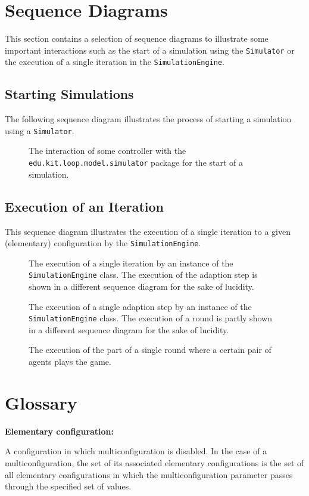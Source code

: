 \documentclass[parskip=full,11pt]{scrartcl}
\begin{document}
\section{Sequence Diagrams}
This section contains a selection of sequence diagrams to illustrate some important interactions such as the start of a simulation using the \texttt{Simulator} or the execution of a single iteration in the \texttt{SimulationEngine}.

\subsection{Starting Simulations}
The following sequence diagram illustrates the process of starting a simulation using a \texttt{Simulator}.
\iftrue
\begin{figure}[h]
	\centering
	\fontsize{5.25}{8}\selectfont
	
	\caption{The interaction of some controller with the \texttt{edu.kit.loop.model.simulator} package for the start of a simulation.}
\end{figure}
\fi
\subsection{Execution of an Iteration}
This sequence diagram illustrates the execution of a single iteration to a given (elementary) configuration by the \texttt{SimulationEngine}.

\iftrue
\begin{figure}[h]
	\centering
	\fontsize{3.25}{8}\selectfont
	
	\caption{The execution of a single iteration by an instance of the \texttt{SimulationEngine} class. The execution of the adaption step is shown in a different sequence diagram for the sake of lucidity.}
\end{figure}
\begin{figure}[h]
	\centering
	\fontsize{3.5}{8}\selectfont
	
	\caption{The execution of a single adaption step by an instance of the \texttt{SimulationEngine} class. The execution of a round is partly shown in a different sequence diagram for the sake of lucidity.}
\end{figure}
\begin{figure}[h]
	\centering
	\fontsize{3.75}{8}\selectfont
	
	\caption{The execution of the part of a single round where a certain pair of agents plays the game.}
\end{figure}
\fi
\section{Glossary}
\textbf{Elementary configuration:}

A configuration in which multiconfiguration is disabled. In the case of a multiconfiguration, the set of its associated elementary configurations is the set of all elementary configurations in which the multiconfiguration parameter passes through the specified set of values.
\end{document}
